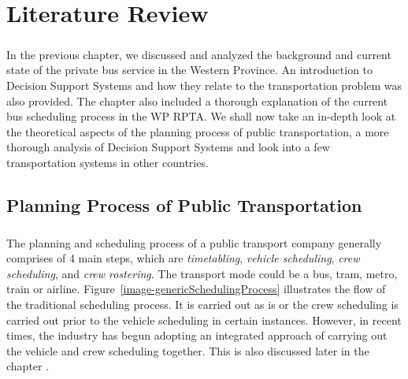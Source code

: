 
\chapter {Literature Review}
\label{chapter-LitReview}

\paragraph{ } In the previous chapter, we discussed and analyzed the background and current state of the private bus service in the Western Province. An introduction to Decision Support Systems and how they relate to the transportation problem was also provided. The chapter also included a thorough explanation of the current bus scheduling process in the WP RPTA. We shall now take an in-depth look at the theoretical aspects of the planning process of public transportation, a more thorough analysis of Decision Support Systems and look into a few transportation systems in other countries.

\section{Planning Process of Public Transportation}

\paragraph{ } The planning and scheduling process of a public transport company generally comprises of 4 main steps, which are \textit{timetabling}, \textit{vehicle scheduling}, \textit{crew scheduling}, and \textit{crew rostering}. The transport mode could be a bus, tram, metro, train or airline. Figure~\ref{image-genericSchedulingProcess} illustrates the flow of the traditional scheduling process. It is carried out as is or the crew scheduling is carried out prior to the vehicle scheduling in certain instances. However, in recent times, the industry has begun adopting an integrated approach of carrying out the vehicle and crew scheduling together. This is also discussed later in the chapter \cite{Huisman2004}.

